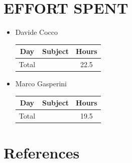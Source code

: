 \documentclass[12pt,a4paper]{article}
\begin{document}
\section{EFFORT SPENT}
\begin{itemize}
\item {Davide Cocco}
 \begin{center}
			\begin{tabular}{| c | l | c |}
				\hline
				\textbf{Day} & \textbf{Subject} & \textbf{Hours} \\ \hline
				Total & & 22.5 \\ \hline
			\end{tabular}
		\end{center}
\item {Marco Gasperini}
\begin{center}
			\begin{tabular}{| c | l | c |}
				\hline
				\textbf{Day} & \textbf{Subject} & \textbf{Hours} \\ \hline
				Total & & 19.5 \\ \hline
			\end{tabular}
\end{center}
\end{itemize}
\section{References}
\end{document}
